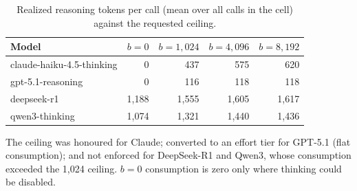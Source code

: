 \begin{table}[!t]
\centering
\caption{Realized reasoning tokens per call (mean over all calls in the cell) against the requested ceiling.}
\label{tab:tokens}
\footnotesize
\setlength{\tabcolsep}{4pt}
\begin{tabular}{lrrrr}
\hline
Model & $b=0$ & $b=1{,}024$ & $b=4{,}096$ & $b=8{,}192$ \\
\hline
claude-haiku-4.5-thinking & 0 & 437 & 575 & 620 \\
gpt-5.1-reasoning & 0 & 116 & 118 & 118 \\
deepseek-r1 & 1,188 & 1,555 & 1,605 & 1,617 \\
qwen3-thinking & 1,074 & 1,321 & 1,440 & 1,436 \\
\hline
\end{tabular}
\par\smallskip\scriptsize The ceiling was honoured for Claude; converted to an effort tier for GPT-5.1 (flat consumption); and not enforced for DeepSeek-R1 and Qwen3, whose consumption exceeded the 1{,}024 ceiling. $b=0$ consumption is zero only where thinking could be disabled.
\end{table}
